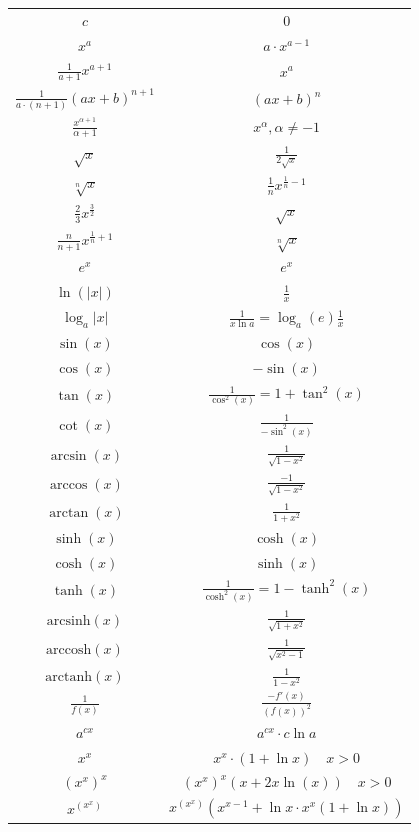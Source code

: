 \begin{center}
\begin{tabular}{c||c}
                $ c $ & $ 0 $ \\
	        $ x^a $ & $ a \cdot x^{a - 1} $ \\
                $ \frac{1}{a+1} x^{a+1} $ & $ x^a $ \\
                $ \frac{1}{a\cdot(n+1)} (ax+b)^{n+1} $ & $ (ax+b)^n $ \\
	        $ \frac{x^{\alpha+1}}{\alpha + 1} $ & $ x^\alpha, \alpha \neq -1 $ \\
                $ \sqrt x $ & $ \frac{1}{2 \sqrt x} $ \\
                $ \sqrt[n] x $ & $ \frac{1}{n} {x}^{ \frac{1}{n} -1 } $ \\
                $ \frac{2}{3} x^{ \frac{3}{2} } $ & $ \sqrt x $ \\
                $ \frac{n}{n+1} x^{ \frac{1}{n}+1 } $ & $ \sqrt[n] x $ \\
	        $ e^x $ & $ e^x $ \\
	        $ \ln(|x|) $ & $ \frac{1}{x} $ \\
                $ \log_a |x| $  &  $ \frac{1}{x \ln a} = \log_a(e) \frac{1}{x} $ \\
	        $ \sin(x) $ & $ \cos(x) $ \\
	        $ \cos(x) $ & $ -\sin(x) $ \\
	        $ \tan(x) $ & $ \frac{1}{\cos^2(x)} = 1 + \tan^2(x) $ \\
	        $ \cot(x) $ & $ \frac{1}{-\sin^2(x)} $ \\
	        $ \arcsin(x) $ & $ \frac{1}{\sqrt{1 - x^2}} $ \\
	        $ \arccos(x) $ & $ \frac{-1}{\sqrt{1 - x^2}} $ \\
	        $ \arctan(x) $ & $ \frac{1}{1 + x^2} $ \\
	        $ \sinh(x) $ & $ \cosh(x) $ \\
	        $ \cosh(x) $ & $ \sinh(x) $ \\
                $ \tanh(x) $ & $ \frac{1}{\cosh^2(x)} = 1 - \tanh^2(x) $ \\
	        $ \text{arcsinh}(x) $ & $ \frac{1}{\sqrt{1 + x^2}} $ \\
	        $ \text{arccosh}(x) $ & $ \frac{1}{\sqrt{x^2 - 1}} $ \\
	        $ \text{arctanh}(x) $ & $ \frac{1}{1 - x^2} $ \\
                $ \frac{1}{f(x)} $ & $ \frac{-f'(x)}{(f(x))^2} $ \\
                $ a^{cx} $ & $ a^{cx} \cdot c \ln a $ \\
                $ x^x $ & $ x^x \cdot (1+\ln x) \quad \scriptstyle x > 0 $ \\
                $ (x^x)^x $ & $ (x^x)^x(x+2x\ln(x)) \quad \scriptstyle x > 0 $ \\
                $ x^{(x^x)} $ & $ x^{(x^x)}(x^{x-1}+\ln x \cdot x^x (1+\ln x)) $ \\
        \end{tabular}


\end{center}
